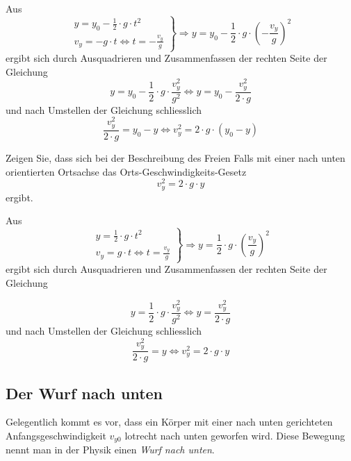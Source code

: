 \begin{solution}
Aus
\[  \left.\begin{array}{r}y=y_{0}-\frac{1}{2} \cdot g \cdot t^{2}\\ v_{y} = -g \cdot t \Leftrightarrow t = - \frac{v_{y}}{g}\end{array} \right\} \Rightarrow y=y_{0} - \frac{1}{2} \cdot g \cdot \left( - \frac{v_{y}}{g} \right)^{2} \]
ergibt sich durch Ausquadrieren und Zusammenfassen der rechten Seite der Gleichung
\[ y=y_{0} -\frac{1}{2} \cdot g \cdot \frac{v_{y}^{2}}{g^{2}} \Leftrightarrow y = y_{0} - \frac{v_{y}^{2}}{2 \cdot g} \]
und nach Umstellen der Gleichung schliesslich
\[ \frac{v_{y}^{2}}{2 \cdot g} = y_{0} - y \Leftrightarrow v_{y}^{2} = 2 \cdot g \cdot (y_{0} - y) \]
\end{solution}

\begin{example}
Zeigen Sie, dass sich bei der Beschreibung des Freien Falls mit einer nach unten orientierten Ortsachse das Orts-Geschwindigkeits-Gesetz
\[ v_{y}^{2} = 2 \cdot g \cdot y \]
ergibt.
\end{example}

\begin{solution}
Aus
\[  \left.\begin{array}{r}y=\frac{1}{2} \cdot g \cdot t^{2}\\ v_{y} = g \cdot t \Leftrightarrow t =  \frac{v_{y}}{g}\end{array} \right\} \Rightarrow y=\frac{1}{2} \cdot g \cdot \left( \frac{v_{y}}{g} \right)^{2} \]
ergibt sich durch Ausquadrieren und Zusammenfassen der rechten Seite der Gleichung

\[ y=\frac{1}{2} \cdot g \cdot \frac{v_{y}^{2}}{g^{2}} \Leftrightarrow y = \frac{v_{y}^{2}}{2 \cdot g} \]
und nach Umstellen der Gleichung schliesslich
\[ \frac{v_{y}^{2}}{2 \cdot g} = y \Leftrightarrow v_{y}^{2} = 2 \cdot g \cdot  y \]
\end{solution}

\subsection{Der Wurf nach unten}
Gelegentlich kommt es vor, dass ein Körper mit einer nach unten gerichteten Anfangsgeschwindigkeit $v_{y0}$ lotrecht nach unten geworfen wird. Diese Bewegung nennt man in der Physik einen \textit{Wurf nach unten}.

